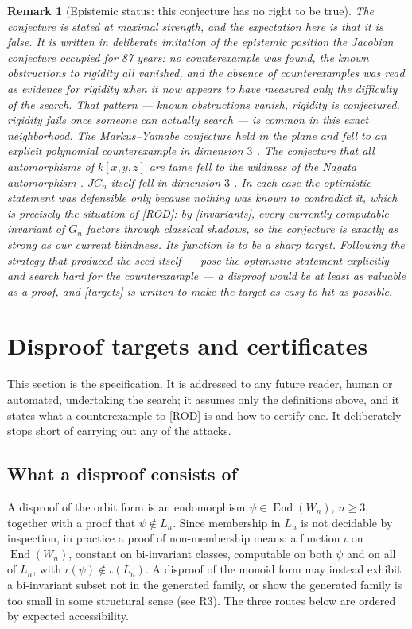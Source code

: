 \documentclass[11pt]{article}
\theoremstyle{change}
\newtheorem{remark}[equation]{Remark}
\theoremstyle{nonumberplain}
\numberwithin{equation}{section}
\DeclareMathOperator{\End}{End}
\begin{document}
\begin{remark}[Epistemic status: this conjecture has no right to be true\label{epistemic}]
The conjecture is stated at maximal strength, and the expectation here is that it is \emph{false}. It is written in deliberate imitation of the epistemic position the Jacobian conjecture occupied for 87 years: no counterexample was found, the known obstructions to rigidity all vanished, and the absence of counterexamples was read as evidence for rigidity when it now appears to have measured only the difficulty of the search. That pattern --- known obstructions vanish, rigidity is conjectured, rigidity fails once someone can actually search --- is common in this exact neighborhood. The Markus--Yamabe conjecture held in the plane and fell to an explicit polynomial counterexample in dimension $3$ \cite{CEGHM}. The conjecture that all automorphisms of $k[x,y,z]$ are tame fell to the wildness of the Nagata automorphism \cite{SU}. $JC_n$ itself fell in dimension $3$ \cite{Alpoge}. In each case the optimistic statement was defensible only because nothing was known to contradict it, which is precisely the situation of \cref{ROD}: by \cref{invariants}, every currently computable invariant of $G_n$ factors through classical shadows, so the conjecture is exactly as strong as our current blindness. Its function is to be a sharp target. Following the strategy that produced the seed itself --- pose the optimistic statement explicitly and search hard for the counterexample --- a disproof would be at least as valuable as a proof, and \cref{targets} is written to make the target as easy to hit as possible.
\end{remark}

\section{Disproof targets and certificates\label{targets}}

This section is the specification. It is addressed to any future reader, human or automated, undertaking the search; it assumes only the definitions above, and it states what a counterexample to \cref{ROD} is and how to certify one. It deliberately stops short of carrying out any of the attacks.

\subsection{What a disproof consists of}

A disproof of the orbit form is an endomorphism $\psi \in \End(W_n)$, $n \geq 3$, together with a proof that $\psi \notin L_n$. Since membership in $L_n$ is not decidable by inspection, in practice a proof of non-membership means: a function $\iota$ on $\End(W_n)$, constant on bi-invariant classes, computable on both $\psi$ and on all of $L_n$, with $\iota(\psi) \notin \iota(L_n)$. A disproof of the monoid form may instead exhibit a bi-invariant subset not in the generated family, or show the generated family is too small in some structural sense (see R3). The three routes below are ordered by expected accessibility.
\end{document}
